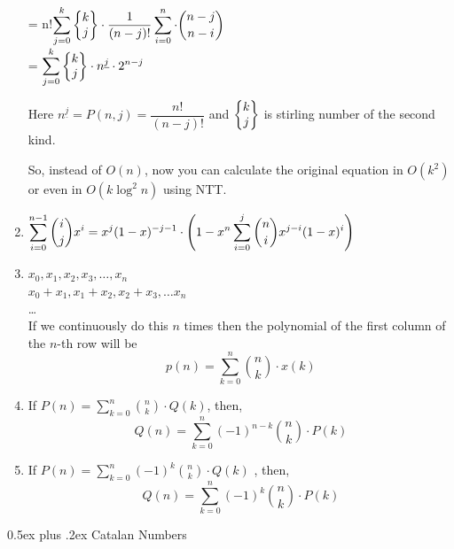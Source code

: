 \documentclass[8pt,a4paper,onesided]{article}
\makeatletter
\renewcommand{\subsection}{\@startsection{subsection}{2}{0mm}
    {-1ex plus -0.5ex minus -0.2ex} %
    {0.5ex plus .2ex}                %
    {\normalfont\large\bfseries}}    %
\makeatother
\begin{document}
\begin{multicols}{3}
\begin{enumerate}
    \\= n!$\displaystyle \sum_{j=0}^{k} \left\{ \begin{matrix} k\cr j \end{matrix} \right\} \cdot \frac{1}{(n-j)!} \sum_{i=0}^{n} \cdot { n-j \choose n-i}$
    \\= $\displaystyle \sum_{j=0}^{k} \left\{\begin{matrix} k\cr j \end{matrix} \right\} \cdot n^{\underline{j}} \cdot 2^{n-j}$

    Here $n^{\underline{j}}=P(n,j)=\dfrac{n!}{(n-j)!}$ and $\displaystyle \left\{ \begin{matrix} k\cr j \end{matrix} \right\}$ is stirling number of the second kind.

    So, instead of $O(n)$, now you can calculate the original equation in $O(k^2)$ or even in $O(k \log^2 n)$ using NTT.
    \item $\displaystyle \displaystyle \sum \limits_{i=0}^{n-1} {i \choose j} x^i = x^j(1-x)^{-j-1} \\ \cdot \left( 1- x^n \sum \limits_{i=0}^j {n \choose i} x^{j-i} (1-x)^i \right)$
    \item $\displaystyle x_{0}, x_{1}, x_{2}, x_{3}, \dots , x_{n}$
    \\ $\displaystyle x_{0} + x_{1}, x_{1} + x_{2}, x_{2}+x_{3}, \dots x_{n}$
    \\ \dots
    \\ If we continuously do this $n$ times then the polynomial of the first column of the $n$-th row will be
    \[\displaystyle p(n)=\sum_{k=0}^{n}{n \choose k} \cdot x(k)\]
    \item If $\displaystyle P(n)=\sum_{k=0}^{n}{n \choose k} \cdot Q(k)$, then,
    \[Q(n)=\sum_{k=0}^{n}(-1)^{n-k}{n \choose k} \cdot P(k)\]
    \item If $\displaystyle P(n)=\sum_{k=0}^{n}(-1)^{k}{n \choose k} \cdot Q(k)$ , then,
    \[Q(n)=\sum_{k=0}^{n}(-1)^{k}{n \choose k} \cdot P(k)\]
\end{enumerate}

\subsection{Catalan Numbers}


\end{multicols}
\end{document}
